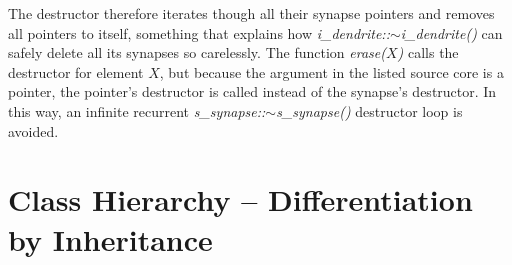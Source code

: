 		The destructor therefore iterates though all their synapse pointers and removes all pointers to itself, something that explains how \emph{i\_dendrite::$\sim$i\_dendrite()} can safely delete all its synapses so carelessly. %
		The function \emph{erase($X$)} calls the destructor for element $X$, but because the argument in the listed source core is a pointer, 
			the pointer's destructor is called instead of the synapse's destructor.
		In this way, an infinite recurrent \emph{s\_synapse::$\sim$s\_synapse()} destructor loop is avoided. 



	\section{Class Hierarchy -- Differentiation by Inheritance}





